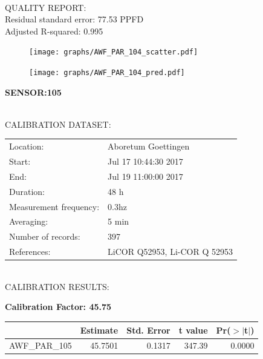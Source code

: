 \documentclass[oneside]{report}
\begin{document}
\hrulefill\\
QUALITY REPORT:\\
Residual standard error: 77.53 PPFD\\
Adjusted R-squared: 0.995



\begin{figure}[H]
  \centering
  \texttt{[image: graphs/AWF\_PAR\_104\_scatter.pdf]}
\end{figure}




\begin{figure}[H]
  \centering
  \texttt{[image: graphs/AWF\_PAR\_104\_pred.pdf]}
\end{figure}

\pagebreak


\begin{center}
\large{\textbf{SENSOR:105}}\\
\end{center}

\hrulefill\\
CALIBRATION DATASET:\\
\begin{table}[h!]
  \centering
  \label{tab:table1}
  \begin{tabular}{ll}
    Location: & Aboretum Goettingen\\ 
    
    
    Start:  & Jul 17 10:44:30 2017 \\
    End:   & Jul 19 11:00:00 2017\\ 
    Duration: & 48 h\\
    Measurement frequency: & 0.3hz\\
    Averaging:  &5 min\\
    Number of records: & 397 \\
    References: & LiCOR Q52953, Li-COR Q 52953 \\
  \end{tabular}
\end{table}

\hrulefill\\
CALIBRATION RESULTS:\\


\begin{center}
\textbf{\large{Calibration Factor: 45.75}}\\
\end{center}
\begin{table}[ht]
\centering
\begin{tabular}{rrrrr}
  \hline
 & Estimate & Std. Error & t value & Pr($>$$|$t$|$) \\ 
  \hline
AWF\_PAR\_105 & 45.7501 & 0.1317 & 347.39 & 0.0000 \\ 
   \hline
\end{tabular}
\end{table}
\end{document}

